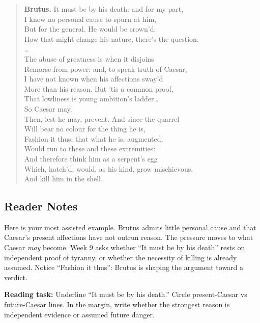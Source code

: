 \documentclass[12pt]{article}
\newenvironment{playpassage}{\begin{quote}\footnotesize\setlength{\parskip}{0.08em}\setlength{\parindent}{0pt}}{\end{quote}}
\newcommand{\speaker}[1]{\textbf{#1.}}
\begin{document}
\begin{playpassage}
\speaker{Brutus} It must be by his death: and for my part,\\
I know no personal cause to spurn at him,\\
But for the general. He would be crown'd:\\
How that might change his nature, there's the question.\\
\ldots\\
The abuse of greatness is when it disjoins\\
Remorse from power: and, to speak truth of Caesar,\\
I have not known when his affections sway'd\\
More than his reason. But 'tis a common proof,\\
That lowliness is young ambition's ladder\ldots\\
So Caesar may.\\
Then, lest he may, prevent. And since the quarrel\\
Will bear no colour for the thing he is,\\
Fashion it thus; that what he is, augmented,\\
Would run to these and these extremities:\\
And therefore think him as a serpent's egg\\
Which, hatch'd, would, as his kind, grow mischievous,\\
And kill him in the shell.
\end{playpassage}

\subsection*{Reader Notes}

Here is your most assisted example. Brutus admits little personal cause and that Caesar's present affections have not outrun reason. The pressure moves to what Caesar \textit{may} become. Week 9 asks whether ``It must be by his death'' rests on independent proof of tyranny, or whether the necessity of killing is already assumed. Notice ``Fashion it thus'': Brutus is shaping the argument toward a verdict.

\textbf{Reading task:} Underline ``It must be by his death.'' Circle present-Caesar vs future-Caesar lines. In the margin, write whether the strongest reason is independent evidence or assumed future danger.

\newpage
\end{document}
